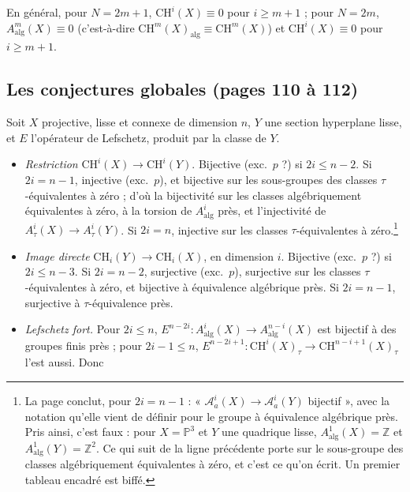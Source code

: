 \documentclass[11pt,a4paper]{article}
\begin{document}
En général, pour $N = 2m + 1$, $\mathrm{CH}^{i}(X) \equiv 0$ pour $i \geqslant m
+ 1$ ; pour $N = 2m$, $A^{m}_{\mathrm{alg}}(X) \equiv 0$ (c'est-à-dire
$\mathrm{CH}^{m}(X)_{\mathrm{alg}} \equiv \mathrm{CH}^{m}(X)$) et
$\mathrm{CH}^{i}(X) \equiv 0$ pour $i \geqslant m + 1$.

\subsection*{Les conjectures globales (pages 110 à 112)}

Soit $X$ projective, lisse et connexe de dimension $n$, $Y$ une section
hyperplane lisse, et $E$ l'opérateur de Lefschetz, produit par la classe de
$Y$.

\begin{itemize}
  \item[(1)] \emph{Restriction} $\mathrm{CH}^{i}(X) \to \mathrm{CH}^{i}(Y)$.
  Bijective (exc.\ $p$ ?) si $2i \leqslant n - 2$. Si $2i = n - 1$, injective
  (exc.\ $p$), et bijective sur les sous-groupes des classes $\tau$-équivalentes à
  zéro ; d'où la bijectivité sur les classes algébriquement équivalentes à zéro,
  à la torsion de $A^{i}_{\mathrm{alg}}$ près, et l'injectivité de
  $A^{i}_{\tau}(X) \to A^{i}_{\tau}(Y)$. Si $2i = n$, injective sur les classes
  $\tau$-équivalentes à zéro.\footnote{La page conclut, pour $2i = n - 1$ :
  « $\mathcal{A}^{i}_{a}(X) \to \mathcal{A}^{i}_{a}(Y)$ bijectif », avec la
  notation qu'elle vient de définir pour le groupe à équivalence algébrique
  près. Pris ainsi, c'est faux : pour $X = \mathbb{P}^{3}$ et $Y$ une quadrique
  lisse, $A^{1}_{\mathrm{alg}}(X) = \mathbb{Z}$ et $A^{1}_{\mathrm{alg}}(Y) =
  \mathbb{Z}^{2}$. Ce qui suit de la ligne précédente porte sur le sous-groupe
  des classes algébriquement équivalentes à zéro, et c'est ce qu'on écrit. Un
  premier tableau encadré est biffé.}
  \item[(2)] \emph{Image directe} $\mathrm{CH}_{i}(Y) \to \mathrm{CH}_{i}(X)$, en
  dimension $i$. Bijective (exc.\ $p$ ?) si $2i \leqslant n - 3$. Si $2i = n - 2$,
  surjective (exc.\ $p$), surjective sur les classes $\tau$-équivalentes à zéro,
  et bijective à équivalence algébrique près. Si $2i = n - 1$, surjective à
  $\tau$-équivalence près.
  \item[(3)] \emph{Lefschetz fort.} Pour $2i \leqslant n$, $E^{n-2i} \colon
  A^{i}_{\mathrm{alg}}(X) \to A^{n-i}_{\mathrm{alg}}(X)$ est bijectif à des
  groupes finis près ; pour $2i - 1 \leqslant n$, $E^{n-2i+1} \colon
  \mathrm{CH}^{i}(X)_{\tau} \to \mathrm{CH}^{n-i+1}(X)_{\tau}$ l'est aussi. Donc

\end{itemize}
\end{document}
